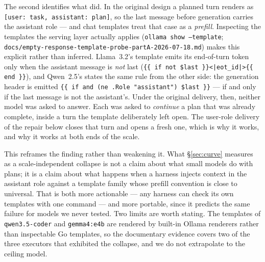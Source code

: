 \documentclass[smallcondensed,natbib]{svjour3}
\begin{document}
The second identifies what did. In the original design a planned turn
renders as \texttt{[user: task, assistant: plan]}, so the last message
before generation carries the assistant role --- and chat templates
treat that case as a \emph{prefill}. Inspecting the templates the
serving layer actually applies (\texttt{ollama show --template};
\texttt{docs/empty-response-template-probe-partA-2026-07-18.md}) makes
this explicit rather than inferred. Llama~3.2's template emits its
end-of-turn token only when the assistant message is \emph{not} last
(\texttt{\{\{ if not \$last \}\}<|eot\_id|>\{\{ end \}\}}), and
Qwen~2.5's states the same rule from the other side: the generation
header is emitted \texttt{\{\{ if and (ne .Role "assistant") \$last
\}\}} --- if and only if the last message is not the assistant's. Under
the original delivery, then, neither model was asked to answer. Each
was asked to \emph{continue} a plan that was already complete, inside a
turn the template deliberately left open. The user-role delivery of the
repair below closes that turn and opens a fresh one, which is why it
works, and why it works at both ends of the scale.

This reframes the finding rather than weakening it. What
\S\ref{sec:curve} measures as a scale-independent collapse is not a
claim about what small models do with plans; it is a claim about what
happens when a harness injects context in the assistant role against a
template family whose prefill convention is close to universal. That is
both more actionable --- any harness can check its own templates with
one command --- and more portable, since it predicts the same failure
for models we never tested. Two limits are worth stating. The templates
of \texttt{qwen3.5-coder} and \texttt{gemma4:e4b} are rendered by
built-in Ollama renderers rather than inspectable Go templates, so the
documentary evidence covers two of the three executors that exhibited
the collapse, and we do not extrapolate to the ceiling model.
\end{document}
